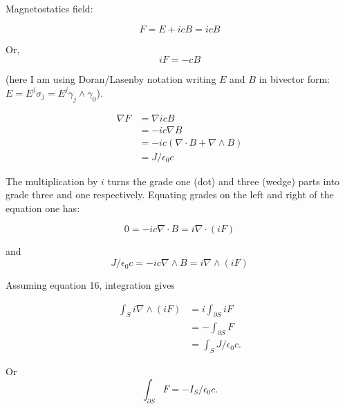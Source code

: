 \documentclass{article}      %
\newcommand{\grad}[0]{\nabla}
\begin{document}

%

Magnetostatics field:

\begin{equation*}
F = E + icB = icB
\end{equation*}

Or,
\begin{equation*}
iF = -cB
\end{equation*}

(here I am using Doran/Lasenby notation writing $E$ and $B$ in bivector form: $E = E^j \sigma_j = E^j \gamma_j \wedge \gamma_0$).

\begin{align*}
\grad F 
&= \grad icB \\
&= -i c \grad B \\
&= -i c \left( \grad \cdot B + \grad \wedge B \right) \\
&= J/\epsilon_0 c
\end{align*}

The multiplication by $i$ turns the grade one (dot) and three (wedge) parts into grade three and one respectively.  Equating grades on the left and right of the equation one has:

\begin{equation*}
0 = -i c \grad \cdot B = i \grad \cdot ( iF )
\end{equation*}

and
\begin{equation*}
J/\epsilon_0 c = -i c \grad \wedge B = i \grad \wedge (iF)
\end{equation*}

Assuming equation 16, integration gives

\begin{align*}
\int_S i \grad \wedge (iF) 
&= i \int_{\partial S} iF \\
&= -\int_{\partial S} F \\
&= \int_S J/\epsilon_0 c.
\end{align*}

Or
\begin{equation*}
\int_{\partial S} F = -I_S/\epsilon_0 c.
\end{equation*}
\end{document}
